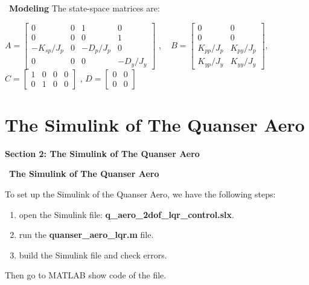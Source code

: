 \documentclass[blue,mathserif,envcountsect,compress,10pt,xcolor=pdftex,dvipsnames,table]{beamer}
\begin{document}
\begin{frame}{\SquareShadowTopLeft~\bf Modeling}
The state-space matrices are:

$ A=\left[\begin{array}{cccc}{0} & {0} & {1} & {0} \\ {0} & {0} & {0} & {1} \\ {-K_{s p} / J_{p}} & {0} & {-D_{p} / J_{p}} & {0} \\ {0} & {0} & {0} & {-D_{y} / J_{y}}\end{array}\right] $ , ~
$ B=\left[\begin{array}{cc}{0} & {0} \\ {0} & {0} \\ {K_{p p} / J_{p}} & {K_{p y} / J_{p}} \\ {K_{y p} / J_{y}} & {K_{y y} / J_{y}}\end{array}\right] $,
\medskip\\
$ C=\left[\begin{array}{llll}{1} & {0} & {0} & {0} \\ {0} & {1} & {0} & {0}\end{array}\right] $ , \quad
$ D = \left[\begin{matrix}
  0 & 0 \\
  0 & 0
\end{matrix}\right] $

\end{frame}


\section{\bf The Simulink of The Quanser Aero}

\begin{frame}%

\thispagestyle{empty}%

\begin{center}
{\bf\color{blue}\large Section 2: The Simulink of The Quanser Aero}
\end{center}
\end{frame}


\begin{frame}{\SquareShadowTopLeft~\bf The Simulink of The Quanser Aero}

To set up the Simulink of the Quanser Aero, we have the following steps:
\begin{enumerate}
  \item open the Simulink file: \textbf{q\_aero\_2dof\_lqr\_control.slx}.
  \item run the \textbf{quanser\_aero\_lqr.m} file.
  \item build the Simulink file and check errors.
\end{enumerate}

Then go to MATLAB show code of the file.
\end{frame}
\end{document}
